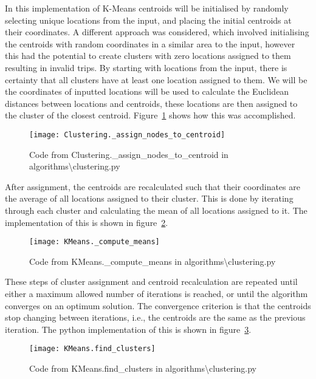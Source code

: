 \noindent
In this implementation of K-Means centroids will be initialised by randomly selecting unique locations from the input,
and placing the initial centroids at their coordinates.
A different approach was considered, which involved initialising the centroids with random coordinates in a similar
area to the input, however this had the potential to create clusters with zero locations assigned to them resulting
in invalid trips.
By starting with locations from the input, there is certainty that all clusters have at least one location assigned to
them.
We will be the coordinates of inputted locations will be used to calculate the Euclidean distances between locations
and centroids, these locations are then assigned to the cluster of the closest centroid.
Figure~\ref{fig:Clustering._assign_nodes_to_centroid} shows how this was accomplished.
\begin{figure}[H]
    \centering
    \texttt{[image: Clustering.\_assign\_nodes\_to\_centroid]}
    \caption{Code from Clustering.\_assign\_nodes\_to\_centroid in algorithms\textbackslash clustering.py}
    \label{fig:Clustering._assign_nodes_to_centroid}
\end{figure}

\noindent
After assignment, the centroids are recalculated such that their coordinates are the average of all locations
assigned to their cluster.
This is done by iterating through each cluster and calculating the mean of all locations assigned to it.
The implementation of this is shown in figure~\ref{fig:KMeans._compute_means}.
\begin{figure}[H]
    \centering
    \texttt{[image: KMeans.\_compute\_means]}
    \caption{Code from KMeans.\_compute\_means in algorithms\textbackslash clustering.py}
    \label{fig:KMeans._compute_means}
\end{figure}

\noindent
These steps of cluster assignment and centroid recalculation are repeated until either a maximum allowed number of
iterations is reached, or until the algorithm converges on an optimum solution.
The convergence criterion is that the centroids stop changing between iterations, i.e., the centroids are the same
as the previous iteration.
The python implementation of this is shown in figure~\ref{fig:KMeans.find_clusters}.
\begin{figure}[H]
    \centering
    \texttt{[image: KMeans.find\_clusters]}
    \caption{Code from KMeans.find\_clusters in algorithms\textbackslash clustering.py}
    \label{fig:KMeans.find_clusters}
\end{figure}

